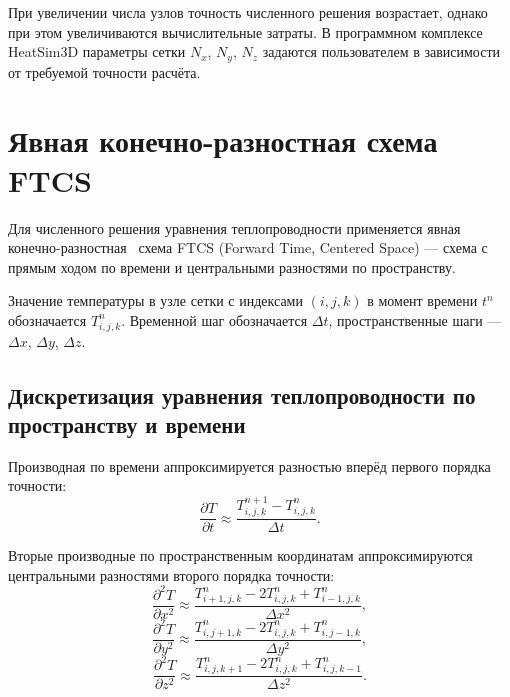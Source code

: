 При увеличении числа узлов точность численного решения возрастает, 
однако при этом увеличиваются вычислительные затраты. В программном 
комплексе HeatSim3D параметры сетки $N_x$, $N_y$, $N_z$ задаются 
пользователем в зависимости от требуемой точности расчёта.

\section{Явная конечно-разностная схема FTCS}

Для численного решения уравнения теплопроводности применяется явная 
конечно-разностная~\cite{kolgan1975finite} схема FTCS (Forward Time, Centered Space) --- схема 
с прямым ходом по времени и центральными разностями по пространству.

Значение температуры в узле сетки с индексами $(i, j, k)$ в момент 
времени $t^n$ обозначается $T_{i,j,k}^n$. Временной шаг обозначается 
$\Delta t$, пространственные шаги --- $\Delta x$, $\Delta y$, $\Delta z$.

\subsection{Дискретизация уравнения теплопроводности по пространству и времени}

Производная по времени аппроксимируется разностью вперёд первого 
порядка точности:
\begin{equation}
    \frac{\partial T}{\partial t} \approx 
    \frac{T_{i,j,k}^{n+1} - T_{i,j,k}^{n}}{\Delta t}.
\end{equation}

Вторые производные по пространственным координатам аппроксимируются 
центральными разностями второго порядка точности:
\begin{equation}
    \frac{\partial^2 T}{\partial x^2} \approx 
    \frac{T_{i+1,j,k}^{n} - 2T_{i,j,k}^{n} + T_{i-1,j,k}^{n}}{\Delta x^2},
\end{equation}
\begin{equation}
    \frac{\partial^2 T}{\partial y^2} \approx 
    \frac{T_{i,j+1,k}^{n} - 2T_{i,j,k}^{n} + T_{i,j-1,k}^{n}}{\Delta y^2},
\end{equation}
\begin{equation}
    \frac{\partial^2 T}{\partial z^2} \approx 
    \frac{T_{i,j,k+1}^{n} - 2T_{i,j,k}^{n} + T_{i,j,k-1}^{n}}{\Delta z^2}.
\end{equation}

